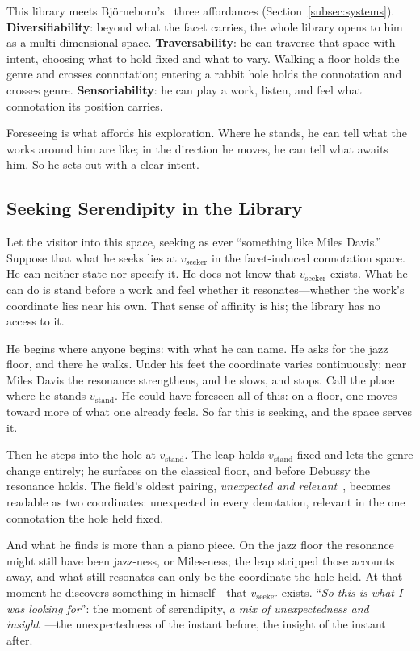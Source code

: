 This library meets Bj\"orneborn's~\citeyearpar{Bjorneborn20171053} three
affordances (Section~\ref{subsec:systems}).
\textbf{Diversifiability}: beyond what the facet carries, the whole library
opens to him as a multi-dimensional space.
\textbf{Traversability}: he can traverse that space with intent, choosing what
to hold fixed and what to vary. Walking a floor holds the genre and crosses
connotation; entering a rabbit hole holds the connotation and crosses genre.
\textbf{Sensoriability}: he can play a work, listen, and feel what connotation
its position carries.

Foreseeing is what affords his exploration. Where he stands, he can tell what
the works around him are like; in the direction he moves, he can tell what
awaits him. So he sets out with a clear intent.

\subsection{Seeking Serendipity in the Library}\label{subsec:seeking}

Let the visitor into this space, seeking as ever ``something like Miles
Davis.'' Suppose that what he seeks lies at $v_\text{seeker}$ in the
facet-induced connotation space. He can neither state nor specify it. He does
not know that $v_\text{seeker}$ exists. What he can do is stand before a work
and feel whether it resonates---whether the work's coordinate lies near his
own. That sense of affinity is his; the library has no access to it.

He begins where anyone begins: with what he can name. He asks for the jazz
floor, and there he walks. Under his feet the coordinate varies continuously;
near Miles Davis the resonance strengthens, and he slows, and stops. Call the
place where he stands $v_\text{stand}$. He could have foreseen all of this: on a
floor, one moves toward more of what one already feels. So far this is seeking,
and the space serves it.

Then he steps into the hole at $v_\text{stand}$. The leap holds
$v_\text{stand}$ fixed and lets the genre change entirely; he surfaces on the
classical floor, and before Debussy the resonance holds. The field's oldest
pairing, \textit{unexpected and relevant}~\citep{Kotkov2016180}, becomes
readable as two coordinates: unexpected in every denotation, relevant in the
one connotation the hole held fixed.

And what he finds is more than a piano piece. On the jazz floor the resonance
might still have been jazz-ness, or Miles-ness; the leap stripped those
accounts away, and what still resonates can only be the coordinate the hole
held. At that moment he discovers something in himself---that
$v_\text{seeker}$ exists. ``\textit{So this is what I was looking for}'': the
moment of serendipity, \textit{a mix of unexpectedness and
    insight}~\citep{Makri2012684}---the unexpectedness of the instant before, the
insight of the instant after.

